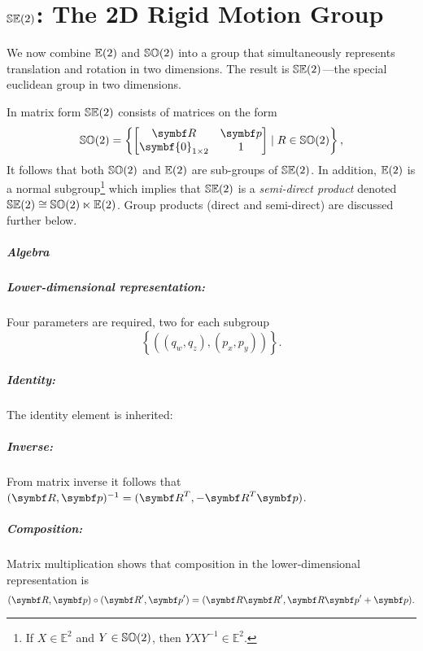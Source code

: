 \chapter{\texorpdfstring{${\mathbb{SE}(2)}$}{SE(2)}: The 2D Rigid Motion Group}

We now combine ${\mathbb{E}(2)}$ and ${\mathbb{SO}(2)}$ into a group that simultaneously represents translation and rotation in two dimensions. The result is ${\mathbb{SE}(2)}$---the special euclidean group in two dimensions.

In matrix form ${\mathbb{SE}(2)}$ consists of matrices on the form
\begin{equation}
  \label{eq:se2_matrix}
  \SOtwo = \left\{ \begin{bmatrix}
    \bR & \bp \\ \symbf{0}_{1 \times 2} & 1
  \end{bmatrix} \mid R \in \SOtwo \right\},
\end{equation}
It follows that both ${\mathbb{SO}(2)}$ and ${\mathbb{E}(2)}$ are sub-groups of ${\mathbb{SE}(2)}$. In addition, ${\mathbb{E}(2)}$ is a normal subgroup\footnote{If $X \in \mathbb{E}^2$ and $Y \in {\mathbb{SO}(2)}$, then $Y X Y^{-1} \in \mathbb{E}^2$.} which implies that ${\mathbb{SE}(2)}$ is a \emph{semi-direct product} denoted ${\mathbb{SE}(2)} \cong {\mathbb{SO}(2)} \ltimes {\mathbb{E}(2)}$. Group products (direct and semi-direct) are discussed further below.

\paragraph{Algebra}

\paragraph{Lower-dimensional representation:} Four parameters are required, two for each subgroup
\begin{equation}
   \left\{ ((q_w, q_z), (p_x, p_y)) \right\}.
\end{equation}

\paragraph{Identity:} The identity element is inherited: 

\paragraph{Inverse:} From matrix inverse it follows that $(\bR, \bp)^{-1} = (\bR^T, -\bR^T \bp)$.

\paragraph{Composition:} Matrix multiplication shows that composition in the lower-dimensional representation is
\begin{equation}
  (\bR, \bp) \circ (\bR', \bp') = (\bR \bR', \bR \bp' + \bp).
\end{equation}


